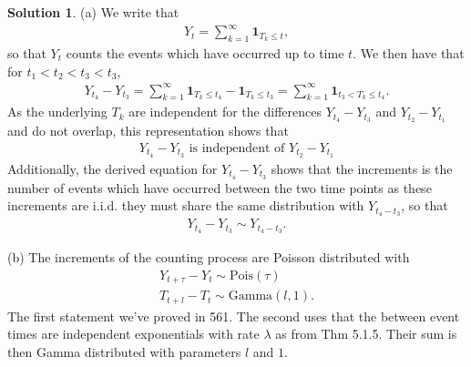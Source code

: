 \documentclass[12pt]{article}
\theoremstyle{definition}
\newtheorem{sol}{Solution}
\theoremstyle{remark}
\begin{document}
\begin{sol}
    (a) We write that 
    \begin{align*}
        Y_{t} = \sum_{k = 1}^{\infty} \mathbf{1}_{T_{k} \leq t},
    \end{align*}
    so that $Y_{t}$ counts the events which have occurred up to time $t$. We then have that for $t_{1} < t_{2} < t_{3} < t_{3}$,
    \begin{align*}
        Y_{t_{4}} - Y_{t_{3}} = \sum_{k = 1}^{\infty} \mathbf{1}_{T_{k} \leq t_{4}} - \mathbf{1}_{T_{k} \leq t_{3}} = \sum_{k=1}^{\infty} \mathbf{1}_{t_{3} < T_{k} \leq t_{4}}. 
    \end{align*}
    As the underlying $T_{k}$ are independent for the differences $Y_{t_{4}} - Y_{t_{3}}$ and $Y_{t_{2}} - Y_{t_{1}}$ and do not overlap, this representation shows that
    \begin{align*}
        Y_{t_{4}} - Y_{t_{3}}  \text{ is independent of } Y_{t_{2}} - Y_{t_{1}}
    \end{align*}
Additionally, the derived equation for $Y_{t_{4}} - Y_{t_{3}}$ shows that the increments is the number of events which have occurred between the two time points as these increments are i.i.d. they must share the same distribution with $Y_{t_{4} - t_{3}}$, so that 
\begin{align*}
    Y_{t_{4}} - Y_{t_{3}} \sim Y_{t_{4} - t_{3}}.
\end{align*}

    (b) The increments of the counting process are Poisson distributed with
     \begin{align*}
         Y_{t + \tau} - Y_{t} \sim \text{Pois}( \tau ) \\
         T_{t + l} - T_{t} \sim \text{Gamma}(l, 1).
    \end{align*}
    The first statement we've proved in 561. The second uses that the between event times are independent exponentials with rate $\lambda$ as from Thm 5.1.5. Their sum is then Gamma distributed with parameters  $l$ and  $1$.


\end{sol}
\end{document}
